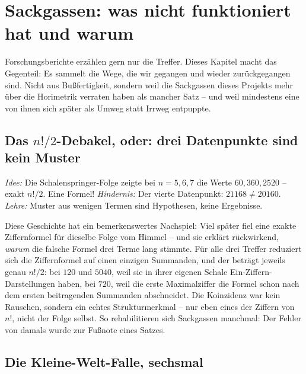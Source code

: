 \chapter{Sackgassen: was nicht funktioniert hat und warum}
\label{ch:sackgassen}


Forschungsberichte erzählen gern nur die Treffer. Dieses Kapitel
macht das Gegenteil: Es sammelt die Wege, die wir gegangen und
wieder zurückgegangen sind. Nicht aus Bußfertigkeit, sondern weil
die Sackgassen dieses Projekts mehr über die Horimetrik verraten
haben als mancher Satz -- und weil mindestens eine von ihnen sich
später als Umweg statt Irrweg entpuppte.

\section{Das $n!/2$-Debakel, oder: drei Datenpunkte sind kein Muster}

\begin{sackgasse}
\emph{Idee:} Die Schalenspringer-Folge zeigte bei $n=5,6,7$ die
Werte $60, 360, 2520$ -- exakt $n!/2$. Eine Formel!
\emph{Hindernis:} Der vierte Datenpunkt: $21168\ne20160$.
\emph{Lehre:} Muster aus wenigen Termen sind Hypothesen, keine
Ergebnisse.
\end{sackgasse}

Diese Geschichte hat ein bemerkenswertes Nachspiel: Viel später
fiel eine exakte Ziffernformel für dieselbe Folge vom Himmel -- und
sie erklärt rückwirkend, \emph{warum} die falsche Formel drei Terme
lang stimmte. Für alle drei Treffer reduziert sich die
Ziffernformel auf einen einzigen Summanden, und der beträgt jeweils
genau $n!/2$: bei $120$ und $5040$, weil sie in ihrer eigenen
Schale Ein-Ziffern-Darstellungen haben, bei $720$, weil die erste
Maximalziffer die Formel schon nach dem ersten beitragenden
Summanden abschneidet. Die Koinzidenz war kein Rauschen,
sondern ein echtes Strukturmerkmal -- nur eben eines der Ziffern
von $n!$, nicht der Folge selbst. So rehabilitieren sich Sackgassen
manchmal: Der Fehler von damals wurde zur Fußnote eines Satzes.

\section{Die Kleine-Welt-Falle, sechsmal}

